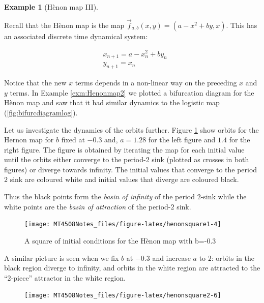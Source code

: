 \documentclass[
  a4paper,
  oneside,
  final]{krantz}
\theoremstyle{definition}
\theoremstyle{definition}
\newtheorem{example}{Example}[chapter]
\theoremstyle{definition}
\theoremstyle{definition}
\theoremstyle{remark}
\begin{document}
\begin{example}[Hènon map III]
\protect\hypertarget{exm:Henonmap3}{}\label{exm:Henonmap3}

Recall that the Hènon map is the map \(\vec{f}_{a,b}(x,y) = (a-x^2 + by, x)\). This has an associated discrete time dynamical system:

\begin{align*}
    &x_{n+1} = a- x_n^2 + by_n \\
    &y_{n+1} = x_{n}
\end{align*}

Notice that the new \(x\) terms depends in a non-linear way on the preceding \(x\) and \(y\) terms. In Example \ref{exm:Henonmap2} we plotted a bifurcation diagram for the Hènon map and saw that it had similar dynamics to the logistic map (\ref{fig:bifurcdiagramlog}).

Let us investigate the dynamics of the orbits further. Figure \ref{fig:henonsquare1} show orbits for the Hernon map for \(b\) fixed at \(-0.3\) and, \(a = 1.28\) for the left figure and \(1.4\) for the right figure. The figure is obtained by iterating the map for each initial value until the orbits either converge to the period-2 sink (plotted as crosses in both figures) or diverge towards infinity. The initial values that converge to the period \(2\) sink are coloured white and initial values that diverge are coloured black.

Thus the black points form the \emph{basin of infinity} of the period \(2\)-sink while the white points are the \emph{basin of attraction} of the period-\(2\) sink.

\begin{figure}

{\centering \texttt{[image: MT4508Notes\_files/figure-latex/henonsquare1-4]} 

}

\caption{A square of initial conditions for the Hènon map with b=-0.3}\label{fig:henonsquare1}
\end{figure}

A similar picture is seen when we fix \(b\) at \(-0.3\) and increase \(a\) to \(2\): orbits in the black region diverge to infinity, and orbits in the white region are attracted to the ``2-piece'' attractor in the white region.

\begin{figure}

{\centering \texttt{[image: MT4508Notes\_files/figure-latex/henonsquare2-6]} 

}
\end{figure}
\end{example}
\end{document}
